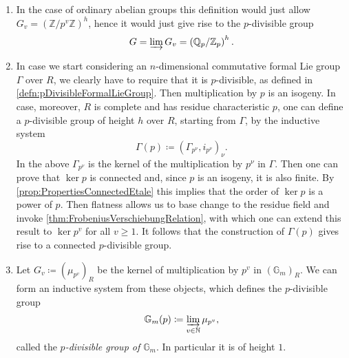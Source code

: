 \begin{ex}\leavevmode\vspace{-.2\baselineskip}\label{ex:pDivGroups}
\begin{enumerate}
\item In the case of ordinary abelian groups this definition would\label{ex:ordinanrypDivGroup}
	just allow
	$G_v = \left( \mathbb{Z}/p^v\mathbb{Z} \right)^h$, hence
	it would just give rise to the $p$-divisible group
	\begin{equation*}
		G = \varinjlim G_v = \left( \mathbb{Q}_p / \mathbb{Z}_p \right)^h
	.\end{equation*} 
	
\item In case we start considering an $n$-dimensional commutative\label{ex:ConnectedpDivGroupFLG}
	formal Lie group $\Gamma$ over $R$, we clearly have to require that it is $p$-divisible,
	as defined in \cref{defn:pDivisibleFormalLieGroup}.
	Then multiplication by $p$ is an isogeny.
	In case, moreover, $R$ is complete and has residue characteristic $p$,
	one can define a $p$-divisible group of height $h$
	over $R$, starting from $\Gamma$, by the inductive system
	\begin{equation*}
		\Gamma(p) \coloneqq \left(\Gamma_{p^\nu}, i_{p^\nu}\right)_\nu
	.\end{equation*} 
	In the above $\Gamma_{p^\nu}$ is the kernel of
	the multiplication by $p^\nu$ in $\Gamma$.
	Then one can prove that $\ker p$ is connected and,
	since $p$ is an isogeny, it is also finite.
	By \cref{prop:PropertiesConnectedEtale} this implies that
	the order of $\ker p$ is a power of $p$.
	Then flatness allows us to base change to the residue field and invoke
	\cref{thm:FrobeniusVerschiebungRelation}, with which one can extend 
	this result to $\ker p^v$ for all $v \geq 1$.
	It follows that the construction of $\Gamma(p)$
	gives rise to a connected $p$-divisible group.

\item Let $G_v \coloneqq (\mu_{p^v})_R$ be the kernel of
	multiplication by $p^v$ in $(\mathbb{G}_m)_R$.
	We can form an inductive system from these objects, which defines
	the $p$-divisible group
	\begin{equation*}
		\mathbb{G}_m(p) \coloneqq \varinjlim_{v \in \mathbb{N}}
		\mu_{p^v}
	,\end{equation*}
	called the {\em $p$-divisible group of $\mathbb{G}_m$}.
	In particular it is of height $1$.


\end{enumerate}
\end{ex}
